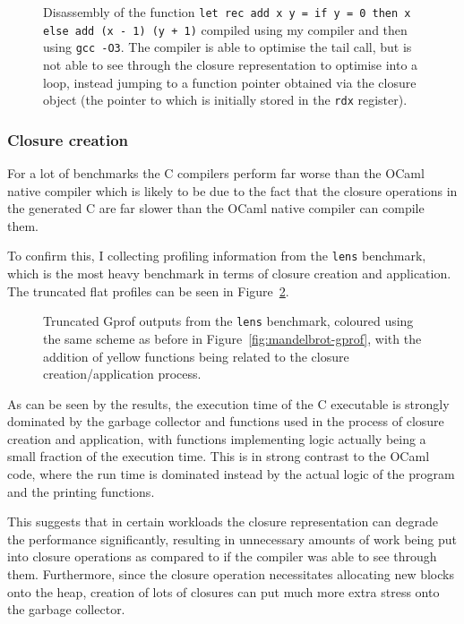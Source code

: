 \begin{figure}
    \centering
    
    \caption{Disassembly of the function \texttt{let rec add x y = if y = 0 
    then x else add (x - 1) (y + 1)} compiled using my compiler and then using 
    \texttt{gcc -O3}. The compiler is able to optimise the tail call, but is 
    not able to see through the closure representation to optimise into a loop, 
    instead jumping to a function pointer obtained via the closure object (the 
    pointer to which is initially stored in the \texttt{rdx} register).}\label{fig:tail-recursion}
\end{figure}

\subsubsection{Closure creation}

For a lot of benchmarks the C compilers perform far worse than the OCaml native
compiler which is likely to be due to the fact that the closure operations in
the generated C are far slower than the OCaml native compiler can compile them.

To confirm this, I collecting profiling information from the \texttt{lens}
benchmark, which is the most heavy benchmark in terms of closure creation and
application. The truncated flat profiles can be seen in
Figure~\ref{fig:closure-creation}.

\begin{figure}
    \centering
    
    \caption{Truncated Gprof outputs from the \texttt{lens} benchmark, coloured 
    using the same scheme as before in Figure~\ref{fig:mandelbrot-gprof}, with 
    the addition of yellow functions being related to the closure 
    creation/application process.}\label{fig:closure-creation}
\end{figure}

As can be seen by the results, the execution time of the C executable is 
strongly dominated by the garbage collector and functions used in the process 
of closure creation and application, with functions implementing logic actually 
being a small fraction of the execution time. This is in strong contrast to the 
OCaml code, where the run time is dominated instead by the actual logic of the 
program and the printing functions.

This suggests that in certain workloads the closure representation can degrade 
the performance significantly, resulting in unnecessary amounts of work being 
put into closure operations as compared to if the compiler was able to see 
through them. Furthermore, since the closure operation necessitates allocating 
new blocks onto the heap, creation of lots of closures can put much more extra 
stress onto the garbage collector.

